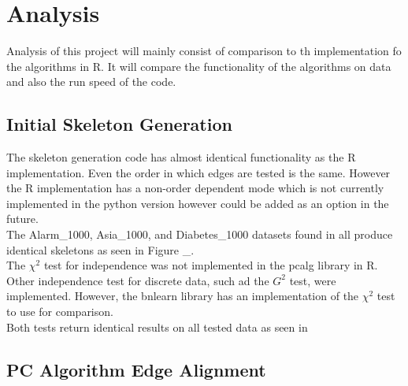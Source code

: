 \documentclass{article}
\begin{document}
\section{Analysis}
Analysis of this project will mainly consist of comparison to th implementation fo the algorithms in R. It will compare the functionality of the algorithms on data and also the run speed of the code.\\

\subsection{Initial Skeleton Generation}
The skeleton generation code has almost identical functionality as the R implementation. Even the order in which edges are tested is the same. However the R implementation has a non-order dependent mode which is not currently implemented in the python version however could be added as an option in the future.\\

The Alarm\_1000, Asia\_1000, and Diabetes\_1000 datasets found in  all produce identical skeletons as seen in Figure \_.\\

The $\chi^2$ test for independence was not implemented in the pcalg library in R. Other independence test for discrete data, such ad the $G^2$ test, were implemented. However, the bnlearn library has an implementation of the $\chi^2$ test to use for comparison.\\

Both tests return identical results on all tested data as seen in

\subsection{PC Algorithm Edge Alignment}
\end{document}
